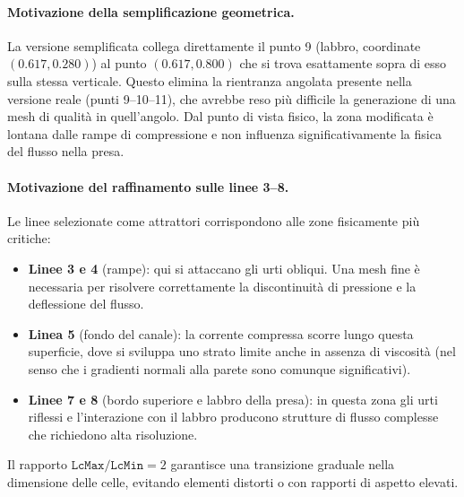 \paragraph{Motivazione della semplificazione geometrica.}
La versione semplificata collega direttamente il punto 9 (labbro, coordinate $(0.617, 0.280)$)
al punto $(0.617, 0.800)$ che si trova esattamente sopra di esso sulla stessa verticale.
Questo elimina la rientranza angolata presente nella versione reale (punti 9--10--11), che
avrebbe reso più difficile la generazione di una mesh di qualità in quell'angolo. Dal punto di
vista fisico, la zona modificata è lontana dalle rampe di compressione e non influenza
significativamente la fisica del flusso nella presa.

\paragraph{Motivazione del raffinamento sulle linee 3--8.}
Le linee selezionate come attrattori corrispondono alle zone fisicamente più critiche:
\begin{itemize}
  \item \textbf{Linee 3 e 4} (rampe): qui si attaccano gli urti obliqui. Una mesh fine è
    necessaria per risolvere correttamente la discontinuità di pressione e la deflessione del
    flusso.
  \item \textbf{Linea 5} (fondo del canale): la corrente compressa scorre lungo questa superficie,
    dove si sviluppa uno strato limite anche in assenza di viscosità (nel senso che i gradienti
    normali alla parete sono comunque significativi).
  \item \textbf{Linee 7 e 8} (bordo superiore e labbro della presa): in questa zona gli urti
    riflessi e l'interazione con il labbro producono strutture di flusso complesse che richiedono
    alta risoluzione.
\end{itemize}

Il rapporto $\texttt{LcMax}/\texttt{LcMin} = 2$ garantisce una transizione graduale nella
dimensione delle celle, evitando elementi distorti o con rapporti di aspetto elevati.

